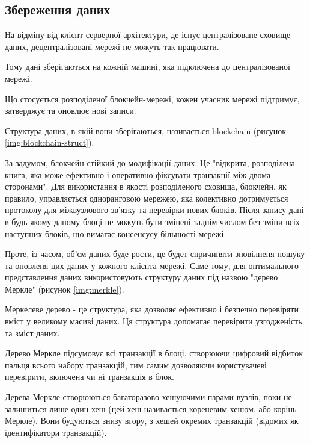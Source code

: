 \documentclass{lib/styles/default-style}
\begin{document}
\subsection{Збереження даних}

    На відміну від клієнт-серверної архітектури, де існує централізоване сховище даних, децентралізовані мережі не можуть
    так працювати.

    Тому дані зберігаються на кожній машині, яка підключена до централізованої мережі.

    Що стосується розподіленої блокчейн-мережі, кожен учасник мережі підтримує, затверджує та оновлює нові записи.

    Структура даних, в якій вони зберігаються, називається blockchain (рисунок \ref{img:blockchain-struct}).


    За задумом, блокчейн стійкий до модифікації даних.
    Це "відкрита, розподілена книга, яка може ефективно і оперативно фіксувати транзакції між двома сторонами".
    Для використання в якості розподіленого сховища, блокчейн,
    як правило, управляється одноранговою мережею,
    яка колективно дотримується протоколу для міжвузлового зв'язку
    та перевірки нових блоків. Після запису дані в будь-якому
    даному блоці не можуть бути змінені заднім числом без зміни всіх наступних блоків,
    що вимагає консенсусу більшості мережі.

    Проте, із часом, об'єм даних буде рости, це будет спричиняти зповілненя пошуку та оновленя цих даних у кожного 
    клієнта мережі. Саме тому, для оптимального представлення даних використовують структуру даних під назвою
    "дерево Меркле" (рисунок \ref{img:merkle}).


    Меркелеве дерево - це структура, яка дозволяє ефективно і
    безпечно перевіряти вміст у великому масиві даних.
    Ця структура допомагає перевірити узгодженість та зміст даних.

    Дерево Меркле підсумовує всі транзакції в блоці,
    створюючи цифровий відбиток пальця всього набору транзакцій,
    тим самим дозволяючи користувачеві перевірити, включена чи ні транзакція в блок.
    
    Дерева Меркле створюються багаторазово хешуючими
    парами вузлів, поки не залишиться лише один хеш
    (цей хеш називається кореневим хешом, або корінь Меркле).
    Вони будуються знизу вгору, з хешей окремих транзакцій (відомих як ідентифікатори транзакцій).
\end{document}
